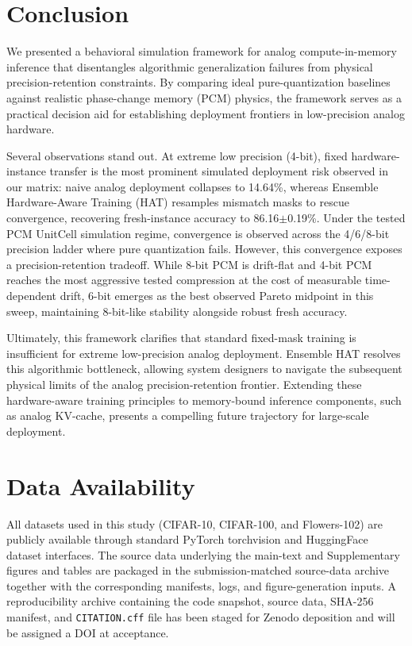 \section{Conclusion}
\label{sec:conclusion}

We presented a behavioral simulation framework for analog compute-in-memory inference that disentangles algorithmic generalization failures from physical precision-retention constraints. By comparing ideal pure-quantization baselines against realistic phase-change memory (PCM) physics, the framework serves as a practical decision aid for establishing deployment frontiers in low-precision analog hardware.

Several observations stand out. At extreme low precision (4-bit), fixed hardware-instance transfer is the most prominent simulated deployment risk observed in our matrix: naive analog deployment collapses to 14.64\%, whereas Ensemble Hardware-Aware Training (HAT) resamples mismatch masks to rescue convergence, recovering fresh-instance accuracy to 86.16$\pm$0.19\%. Under the tested PCM UnitCell simulation regime, convergence is observed across the 4/6/8-bit precision ladder where pure quantization fails. However, this convergence exposes a precision-retention tradeoff. While 8-bit PCM is drift-flat and 4-bit PCM reaches the most aggressive tested compression at the cost of measurable time-dependent drift, 6-bit emerges as the best observed Pareto midpoint in this sweep, maintaining 8-bit-like stability alongside robust fresh accuracy.

Ultimately, this framework clarifies that standard fixed-mask training is insufficient for extreme low-precision analog deployment. Ensemble HAT resolves this algorithmic bottleneck, allowing system designers to navigate the subsequent physical limits of the analog precision-retention frontier. Extending these hardware-aware training principles to memory-bound inference components, such as analog KV-cache, presents a compelling future trajectory for large-scale deployment.

\section*{Data Availability}
All datasets used in this study (CIFAR-10, CIFAR-100, and Flowers-102) are publicly available through standard PyTorch torchvision and HuggingFace dataset interfaces. The source data underlying the main-text and Supplementary figures and tables are packaged in the submission-matched source-data archive together with the corresponding manifests, logs, and figure-generation inputs. A reproducibility archive containing the code snapshot, source data, SHA-256 manifest, and \texttt{CITATION.cff} file has been staged for Zenodo deposition and will be assigned a DOI at acceptance.

